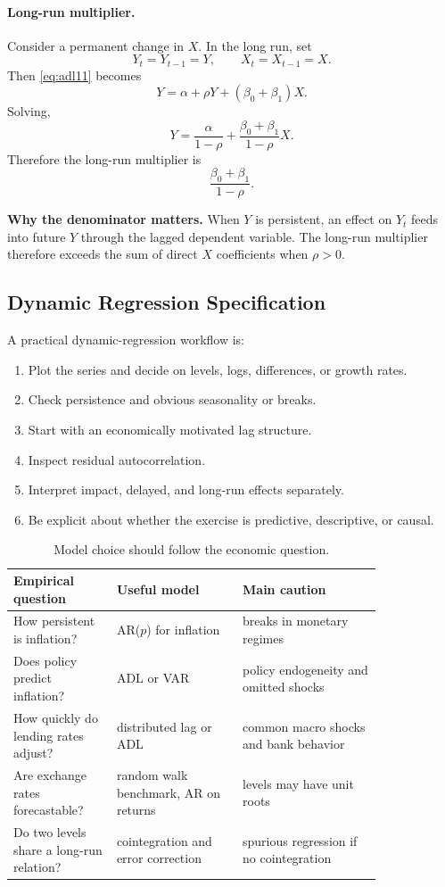 \paragraph{Long-run multiplier.}
Consider a permanent change in $X$. In the long run, set
\[
Y_t=Y_{t-1}=Y,
\qquad
X_t=X_{t-1}=X.
\]
Then \eqref{eq:adl11} becomes
\[
Y=\alpha+\rho Y+(\beta_0+\beta_1)X.
\]
Solving,
\[
Y=\frac{\alpha}{1-\rho}+\frac{\beta_0+\beta_1}{1-\rho}X.
\]
Therefore the long-run multiplier is
\begin{equation}
\frac{\beta_0+\beta_1}{1-\rho}.
\label{eq:adl_lrm}
\end{equation}

\begin{boxD}
\textbf{Why the denominator matters.}
When $Y$ is persistent, an effect on $Y_t$ feeds into future $Y$ through the lagged dependent variable. The long-run multiplier therefore exceeds the sum of direct $X$ coefficients when $\rho>0$.
\end{boxD}

\subsection{Dynamic Regression Specification}
A practical dynamic-regression workflow is:
\begin{enumerate}
\item Plot the series and decide on levels, logs, differences, or growth rates.
\item Check persistence and obvious seasonality or breaks.
\item Start with an economically motivated lag structure.
\item Inspect residual autocorrelation.
\item Interpret impact, delayed, and long-run effects separately.
\item Be explicit about whether the exercise is predictive, descriptive, or causal.
\end{enumerate}

\begin{table}[h]
\centering
\small
\begin{tabular}{p{0.23\linewidth}p{0.28\linewidth}p{0.31\linewidth}}
\toprule
Empirical question & Useful model & Main caution \\
\midrule
How persistent is inflation? & AR($p$) for inflation & breaks in monetary regimes \\
Does policy predict inflation? & ADL or VAR & policy endogeneity and omitted shocks \\
How quickly do lending rates adjust? & distributed lag or ADL & common macro shocks and bank behavior \\
Are exchange rates forecastable? & random walk benchmark, AR on returns & levels may have unit roots \\
Do two levels share a long-run relation? & cointegration and error correction & spurious regression if no cointegration \\
\bottomrule
\end{tabular}
\caption{Model choice should follow the economic question.}
\label{tab:model_choice}
\end{table}

